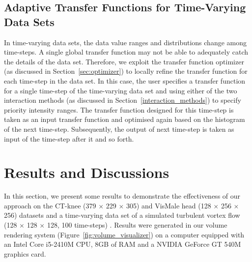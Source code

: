 
\subsection{Adaptive Transfer Functions for Time-Varying Data Sets}
In time-varying data sets, the data value ranges and distributions change among time-steps. A single global transfer function may not be able to adequately catch the details of the data set.
Therefore, we exploit the transfer function optimizer (as discussed in Section~\ref{sec:optimizer}) to locally refine the transfer function for each time-step in the data set.
In this case, the user specifies a transfer function for a single time-step of the time-varying data set and using either of the two interaction methods (as discussed in Section~\ref{interaction_methods}) to specify priority intensity ranges.
The transfer function designed for this time-step is taken as an input transfer function and optimised again based on the histogram of the next time-step. Subsequently, the output of next time-step is taken as input of the time-step after it and so forth.

\section{Results and Discussions}
In this section, we present some results to demonstrate the effectiveness of our approach on the CT-knee (379 $ \times $ 229 $ \times $ 305) and VisMale head (128 $ \times $ 256 $ \times $ 256) datasets \cite{website:Roettger_volume_2013} and a time-varying data set of a simulated turbulent vortex flow (128 $\times$ 128 $\times$ 128, 100 time-steps) \cite{ma_high_2000}.
Results were generated in our volume rendering system (Figure~\ref{fig:volume_visualizer}) on a computer equipped with an Intel Core i5-2410M CPU, 8GB of RAM and a NVIDIA GeForce GT 540M graphics card.

